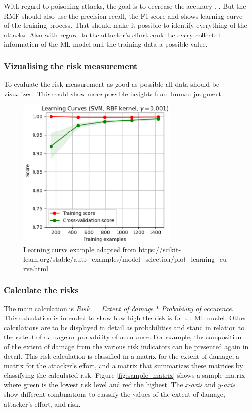 With regard to poisoning attacks, the goal is to decrease the accuracy \cite{DBLP:conf/icml/BiggioNL12}, \cite{DBLP:journals/corr/abs-1708-06733}. But the RMF should also use the precision-recall, the F1-score and shows learning curve of the training process. That should make it possible to identify everything of the attacks. Also with regard to the attacker's effort could be every collected information of the ML model and the training data a possible value.

\subsubsection*{Vizualising the risk measurement}

To evaluate the risk measurement as good as possible all data should be visualized. This could show more possible insights from human judgment.

\begin{figure}[ht!]
  \centering
  \includegraphics[width=8cm]{pictures/learning_curve_example.png}
  \caption{Learning curve example adapted from \url{https://scikit-learn.org/stable/auto_examples/model_selection/plot_learning_curve.html}}
  \label{fig:learning_curve_example}
\end{figure}

\subsubsection*{Calculate the risks}

The main calculation is $Risk = $ \textit{Extent of damage} $*$ \textit{Probability of occurence}. This calculation is intended to show how high the risk is for an ML model. Other calculations are to be displayed in detail as probabilities and stand in relation to the extent of damage or probability of occurance. For example, the composition of the extent of damage from the various risk indicators can be presented again in detail. This risk calculation is classified in a matrix for the extent of damage, a matrix for the attacker's effort, and a matrix that summarizes these matrices by classifying the calculated risk. Figure \ref{fig:sample_matrix} shows a sample matrix where green is the lowest risk level and red the highest. The \textit{x-axis} and \textit{y-axis} show different combinations to classify the values of the extent of damage, attacker's effort, and risk.

